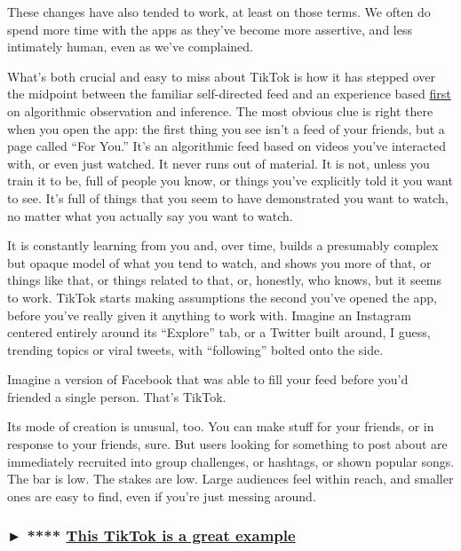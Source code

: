 These changes have also tended to work, at least on those terms. We
often do spend more time with the apps as they've become more assertive,
and less intimately human, even as we've complained.

What's both crucial and easy to miss about TikTok is how it has stepped
over the midpoint between the familiar self-directed feed and an
experience based
\href{https://motherboard.vice.com/en_us/article/kzdwn9/tiktok-cant-save-us-from-algorithmic-content-hell}{first}
on algorithmic observation and inference. The most obvious clue is right
there when you open the app: the first thing you see isn't a feed of
your friends, but a page called ``For You.'' It's an algorithmic feed
based on videos you've interacted with, or even just watched. It never
runs out of material. It is not, unless you train it to be, full of
people you know, or things you've explicitly told it you want to see.
It's full of things that you seem to have demonstrated you want to
watch, no matter what you actually say you want to watch.

It is constantly learning from you and, over time, builds a presumably
complex but opaque model of what you tend to watch, and shows you more
of that, or things like that, or things related to that, or, honestly,
who knows, but it seems to work. TikTok starts making assumptions the
second you've opened the app, before you've really given it anything to
work with. Imagine an Instagram centered entirely around its ``Explore''
tab, or a Twitter built around, I guess, trending topics or viral
tweets, with ``following'' bolted onto the side.

Imagine a version of Facebook that was able to fill your feed before
you'd friended a single person. That's TikTok.

Its mode of creation is unusual, too. You can make stuff for your
friends, or in response to your friends, sure. But users looking for
something to post about are immediately recruited into group challenges,
or hashtags, or shown popular songs. The bar is low. The stakes are low.
Large audiences feel within reach, and smaller ones are easy to find,
even if you're just messing around.

\hypertarget{--this-tiktok-is-a-great-example}{%
\subsubsection{\texorpdfstring{► ****
\textbf{\href{https://www.tiktok.com/share/video/6652983964904459522}{This
TikTok is a great
example}}}{► **** This TikTok is a great example}}\label{--this-tiktok-is-a-great-example}}


